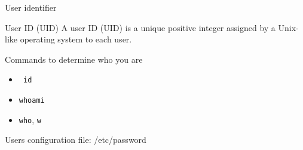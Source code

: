 \begin{frame}[fragile]{User identifier}

\begin{block}{User ID (UID)}
\alert{A user ID (UID)} is a unique positive integer assigned by a Unix-like operating system to each user.
\end{block}

Commands to determine who you are
  \begin{itemize}
    \item \verb| id |
    \item \verb|whoami|
    \item \verb|who|, \verb|w|
  \end{itemize}
Users configuration file:  \alert{/etc/password}
\end{frame}

